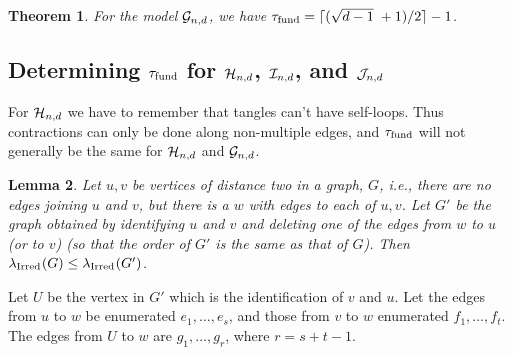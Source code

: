 \documentclass[12pt]{article}
\newtheorem{theorem}{Theorem}[section]
\newtheorem{lemma}[theorem]{Lemma}
\newcommand{\cg}{{\cal G}}
\newcommand{\ch}{{\cal H}}
\newcommand{\ci}{{\cal I}}
\newcommand{\cj}{{\cal J}}
\newcommand{\cjnd}{\cj_{n,d}}
\newcommand{\cind}{\ci_{n,d}}
\newcommand{\cgnd}{\cg_{n,d}}
\newcommand{\chnd}{\ch_{n,d}}
\newcommand{\fund}{{\rm fund}}
\newcommand{\taufund}{{\tau_\fund}}
\newcommand{\proof}{{\par\noindent {\bf Proof}\space\space}}
\newcommand{\ird}[1]{{\rm Irred}_{#1}}
\begin{document}
\begin{theorem} For the model $\cgnd$, we have 
$\taufund=\lceil (\sqrt{d-1}\;+1)/2 \rceil-1$.
\end{theorem}

\subsection{Determining $\taufund$ for $\chnd$, $\cind$, and $\cjnd$}

For $\chnd$ we have to remember that tangles can't have self-loops.
Thus contractions can only be done along non-multiple edges,
and $\taufund$ will not generally be the same for $\chnd$ and $\cgnd$.

\begin{lemma}\label{lm:contract_distance_two}
Let $u,v$ be vertices of distance two in a graph, $G$, 
i.e., there are no
edges joining $u$ and $v$, but there is a $w$ with edges to each of
$u,v$.  Let $G'$ be the graph obtained by identifying $u$ and $v$
and deleting one of the edges from $w$ to $u$ (or to $v$) (so that the order
of $G'$ is the same as that of $G$).
Then $\lambda_{\ird{}}(G)\le \lambda_{\ird{}}(G')$.
\end{lemma}
\proof Let $U$ be the vertex in $G'$ which is the identification of
$v$ and $u$.  Let the edges from $u$ to $w$ be enumerated
$e_1,\ldots,e_s$, and those from $v$ to $w$ enumerated $f_1,\ldots,f_t$.
The edges from $U$ to $w$ are $g_1,\ldots,g_r$, where $r=s+t-1$.
\end{document}
